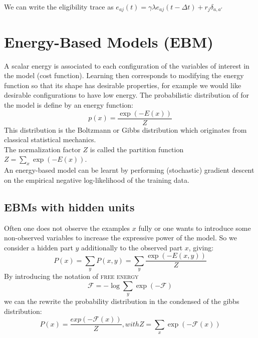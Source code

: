 \documentclass[11pt]{article}
\begin{document}
We can write the eligibility trace as $e_{aj}(t) = \gamma \lambda e_{aj}(t-\Delta t) + r_j\delta_{a,a'}$

\section{Energy-Based Models (EBM)}
A scalar energy is associated to each configuration of the variables of interest in the model (cost function). Learning then corresponds to modifying the energy function so that its shape has desirable properties, for example we would like desirable configurations to have low energy. The probabilistic distribution of for the model is define by an energy function:
\[
	p(x)=\frac{\exp(-E(x))}{Z}
\]
This distribution is the Boltzmann or Gibbs distribution which originates from classical statistical mechanics.\\
The normalization factor $Z$ is called the partition function $Z=\sum_x \exp(-E(x))$.\\
An energy-based model can be learnt by performing (stochastic) gradient descent on the empirical negative log-likelihood of the training data.

\subsection{EBMs with hidden units}
Often one does not observe the examples $x$ fully or one wants to introduce some non-observed variables to increase the expressive power of the model. So we consider a hidden part $y$ additionally to the observed part $x$, giving:
\[ 
	P(x) = \sum_y P(x,y) = \sum_y \frac{\exp(-E(x,y))}{Z}
\]
By introducing the notation of \textsc{free energy}
\[
	\mathcal{F}= -\log\sum_y \exp(-\mathcal{F})
\]
we can the rewrite the probability distribution in the condensed of the gibbs distribution:
\[
	P(x)=\frac{exp(-\mathcal{F}(x))}{Z}, with Z=\sum_x \exp(-\mathcal{F}(x))
\]
\end{document}
